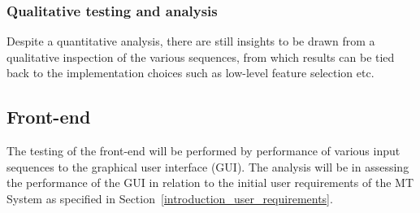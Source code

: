 \subsubsection{Qualitative testing and analysis}
Despite a quantitative analysis, there are still insights to be drawn from a
qualitative inspection of the various sequences, from which results can be tied
back to the implementation choices such as low-level feature selection etc.

\subsection{Front-end}
The testing of the front-end will be performed by performance of various input
sequences to the graphical user interface (GUI). The analysis will be in assessing the
performance of the GUI in relation to the initial user requirements of the MT
System as specified in Section~\ref{introduction_user_requirements}.



